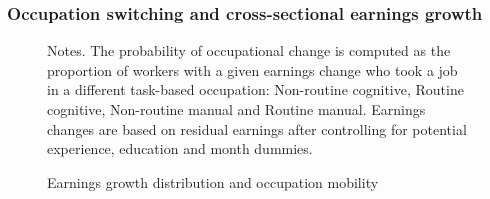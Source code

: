 \documentclass[12pt]{article}
\theoremstyle{definition}
\begin{document}
\subsubsection{Occupation switching and cross-sectional earnings growth}

\begin{figure}[H]
    \noindent\caption{Earnings growth distribution and occupation mobility}
    \begin{center}
    \end{center}
    \vspace{-20pt}
    {\footnotesize Notes. The probability of occupational change is computed as the proportion of workers with a given earnings change who took a job in a different task-based occupation: Non-routine cognitive, Routine cognitive, Non-routine manual and Routine manual. Earnings changes are based on residual earnings after controlling for potential experience, education and month dummies.}
    \label{carrillo-tudelaCyclicalEarningsCareer2022_fig2}
\end{figure}
\end{document}
